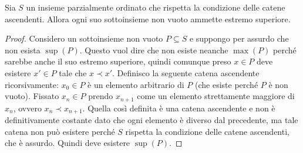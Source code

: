 \documentclass[12pt]{article}
\numberwithin{theorem}{subsection}
\newcommand{\setN}{\mathbb{N}}
\begin{document}
%
\begin{prop}
	Sia $S$ un insieme parzialmente ordinato che rispetta la condizione delle catene ascendenti. Allora ogni suo sottoinsieme non vuoto ammette estremo superiore.
\end{prop}
\begin{proof}
	Considero un sottoinsieme non vuoto $P \subseteq S$ e suppongo per assurdo che non esista $\sup(P)$.
	Questo vuol dire che non esiste neanche $\max(P)$ perché sarebbe anche il suo estremo superiore, quindi comunque preso $x \in P$ deve esistere $x' \in P$ tale che $x \prec x'$.
	Definisco la seguente catena ascendente ricorsivamente: $x_0 \in P$ è un elemento arbitrario di $P$ (che esiste perché $P$ è non vuoto). Fissato $x_n \in P$ prendo $x_{n+1}$ come un elemento strettamente maggiore di $x_n$, ovvero $x_n \prec x_{n+1}$.
	Quella così definita è una catena ascendente e non è definitivamente costante dato che ogni elemento è diverso dal precedente, ma tale catena non può esistere perché $S$ rispetta la condizione delle catene ascendenti, che è assurdo. Quindi deve esistere $\sup(P)$.
\end{proof}
\end{document}
